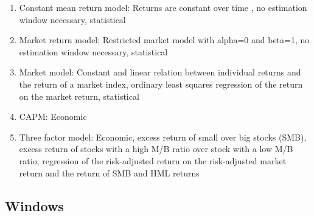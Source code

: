 \documentclass[12pt]{article}
\begin{document}
    \begin{enumerate}
        \item Constant mean return model: Returns are constant over time , no estimation window necessary, statistical

        \item Market return model: Restricted market model with alpha=0 and beta=1, no estimation window necessary, statistical

        \item Market model: Constant and linear relation between individual returns and the return of a market index, ordinary least squares regression of the return on the market return, statistical

        \item CAPM: Economic

        \item Three factor model: Economic, excess return of small over big stocks (SMB), excess return of stocks with a high M/B ratio over stock with a low M/B ratio, regression of the risk-adjusted return on the risk-adjusted market return and the return of SMB and HML returns 
    \end{enumerate}



\subsection{Windows}
\end{document}
